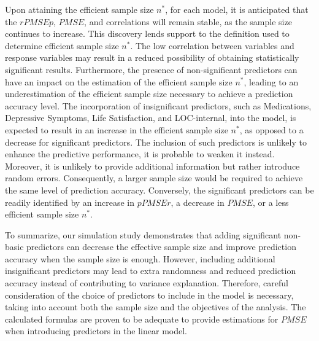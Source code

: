 Upon attaining the efficient sample size $n^*$, for each model, it is anticipated that the $rPMSEp$, $PMSE$, and correlations will remain stable, as the sample size continues to increase. This discovery lends support to the definition used to determine efficient sample size $n^*$. The low correlation between variables and response variables may result in a reduced possibility of obtaining statistically significant results. Furthermore, the presence of non-significant predictors can have an impact on the estimation of the efficient sample size $n^*$, leading to an underestimation of the efficient sample size necessary to achieve a prediction accuracy level. The incorporation of insignificant predictors, such as Medications, Depressive Symptoms, Life Satisfaction, and LOC-internal, into the model, is expected to result in an increase in the efficient sample size $n^*$, as opposed to a decrease for significant predictors. The inclusion of such predictors is unlikely to enhance the predictive performance, it is probable to weaken it instead. Moreover, it is unlikely to provide additional information but rather introduce random errors. Consequently, a larger sample size would be required to achieve the same level of prediction accuracy. Conversely, the significant predictors can be readily identified by an increase in $pPMSEr$, a decrease in $PMSE$, or a less efficient sample size $n^*$.

To summarize, our simulation study demonstrates that adding significant non-basic predictors can decrease the effective sample size and improve prediction accuracy when the sample size is enough. However, including additional insignificant predictors may lead to extra randomness and reduced prediction accuracy instead of contributing to variance explanation. Therefore, careful consideration of the choice of predictors to include in the model is necessary, taking into account both the sample size and the objectives of the analysis. The calculated formulas are proven to be adequate to provide estimations for $PMSE$ when introducing predictors in the linear model.





